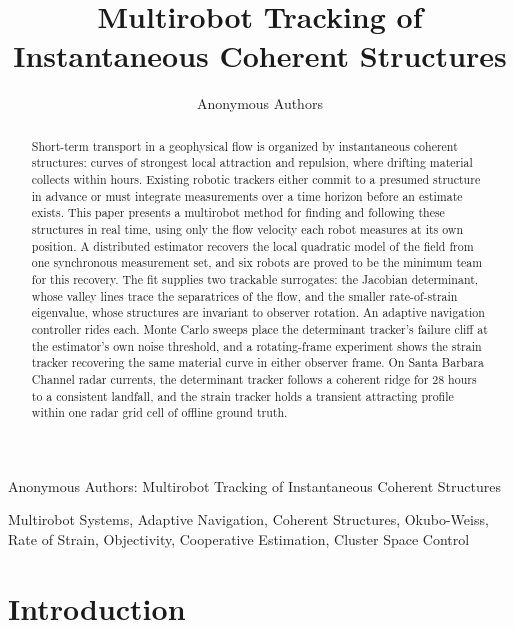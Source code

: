 \documentclass[lettersize,journal]{IEEEtran}
\begin{document}
\title{Multirobot Tracking of
Instantaneous Coherent Structures}

\author{Anonymous Authors}
%
{Anonymous Authors: Multirobot Tracking of Instantaneous Coherent Structures}

\maketitle

\begin{abstract}
Short-term transport in a geophysical flow is organized by
instantaneous coherent structures: curves of strongest local attraction
and repulsion, where drifting material collects within hours. Existing
robotic trackers either commit to a presumed structure in advance or
must integrate measurements over a time horizon before an estimate
exists. This paper presents a multirobot method for finding and
following these structures in real time, using only the flow velocity
each robot measures at its own position. A distributed estimator
recovers the local quadratic model of the field from one synchronous
measurement set, and six robots are proved to be the minimum team for
this recovery. The fit supplies two trackable surrogates: the Jacobian
determinant, whose valley lines trace the separatrices of the flow, and
the smaller rate-of-strain eigenvalue, whose structures are invariant
to observer rotation. An adaptive navigation controller rides each.
Monte Carlo sweeps place the determinant tracker's failure cliff at the
estimator's own noise threshold, and a rotating-frame experiment shows
the strain tracker recovering the same material curve in either
observer frame. On Santa Barbara Channel radar currents, the
determinant tracker follows a coherent ridge for 28 hours to a
consistent landfall, and the strain tracker holds a transient
attracting profile within one radar grid cell of offline ground truth.
\end{abstract}

\begin{IEEEkeywords}
Multirobot Systems, Adaptive Navigation, Coherent Structures,
Okubo-Weiss, Rate of Strain, Objectivity, Cooperative
Estimation, Cluster Space Control
\end{IEEEkeywords}

\section{Introduction}
\label{sec:intro}
\end{document}
